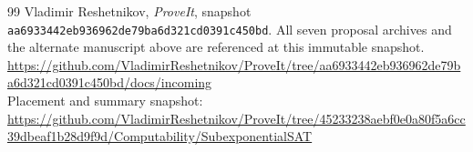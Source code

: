 \documentclass[11pt,letterpaper]{article}
\numberwithin{equation}{section}
\theoremstyle{definition}\newtheorem{definition}[theorem]{Definition}
\theoremstyle{remark}\newtheorem{remark}[theorem]{Remark}
\begin{document}
\begin{thebibliography}{99}
Vladimir Reshetnikov, \emph{ProveIt}, snapshot
\texttt{aa6933442eb936962de79ba6d321cd0391c450bd}.
All seven proposal archives and the alternate manuscript above are
referenced at this immutable snapshot.\\
\url{https://github.com/VladimirReshetnikov/ProveIt/tree/aa6933442eb936962de79ba6d321cd0391c450bd/docs/incoming}\\
Placement and summary snapshot:\\
\url{https://github.com/VladimirReshetnikov/ProveIt/tree/45233238aebf0e0a80f5a6cc39dbeaf1b28d9f9d/Computability/SubexponentialSAT}
\end{thebibliography}
\end{document}
